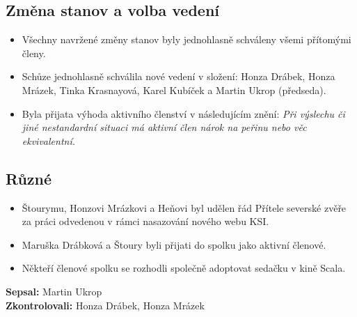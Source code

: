 \documentclass[11pt,a4paper]{article}
\begin{document}
\subsection*{Změna stanov a volba vedení}
\begin{itemize}[itemsep=0pt]
\item Všechny navržené změny stanov byly jednohlasně schváleny všemi přítomými členy.
\item Schůze jednohlasně schválila nové vedení v složení: Honza Drábek, Honza Mrázek, Tinka Krasnayová, Karel Kubíček a Martin Ukrop (předseda).
\item Byla přijata výhoda aktivního členství v následujícím znění: \textit{Při výslechu či jiné nestandardní situaci má aktivní člen nárok na peřinu nebo věc ekvivalentní.}
\end{itemize}

\subsection*{Různé}
\begin{itemize}[itemsep=0pt]
\item Štourymu, Honzovi Mrázkovi a Heňovi byl udělen řád Přítele severské zvěře za práci odvedenou v rámci nasazování nového webu KSI.
\item Maruška Drábková a Štoury byli přijati do spolku jako aktivní členové.
\item Někteří členové spolku se rozhodli společně adoptovat sedačku v kině Scala.
\end{itemize}
\textbf{Sepsal:} Martin Ukrop\\
\textbf{Zkontrolovali:} Honza Drábek, Honza Mrázek 
\end{document}
